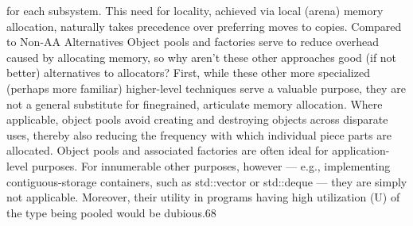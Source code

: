 for each subsystem. This need for locality, achieved via local (arena) memory
allocation, naturally takes precedence over preferring moves to copies.
Compared to Non-AA Alternatives
Object pools and factories serve to reduce overhead caused by allocating memory, so
why aren’t these other approaches good (if not better) alternatives to allocators?
First, while these other more specialized (perhaps more familiar) higher-level
techniques serve a valuable purpose, they are not a general substitute for finegrained, articulate memory allocation. Where applicable, object pools avoid creating
and destroying objects across disparate uses, thereby also reducing the frequency
with which individual piece parts are allocated. Object pools and associated factories
are often ideal for application-level purposes. For innumerable other purposes,
however — e.g., implementing contiguous-storage containers, such as std::vector
or std::deque — they are simply not applicable. Moreover, their utility in programs
having high utilization (U) of the type being pooled would be dubious.68

